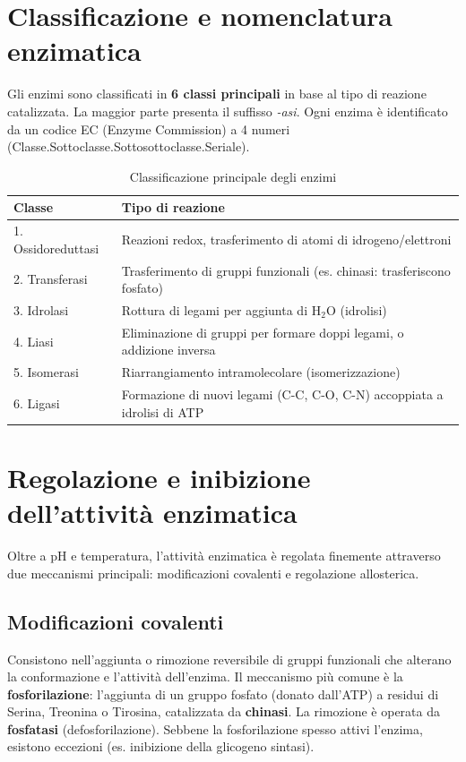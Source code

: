 \documentclass[12pt,a4paper]{report}
\begin{document}
\section{Classificazione e nomenclatura enzimatica}
Gli enzimi sono classificati in \textbf{6 classi principali} in base al tipo di reazione catalizzata. La maggior parte presenta il suffisso \textit{-asi}. Ogni enzima è identificato da un codice EC (Enzyme Commission) a 4 numeri (Classe.Sottoclasse.Sottosottoclasse.Seriale).
\begin{table}[htbp]
\centering
\caption{Classificazione principale degli enzimi}
\label{tab:enzimi-classi}
\renewcommand{\arraystretch}{1.2}
\begin{tabular}{@{} p{} p{} @{}}
\toprule
\textbf{Classe} & \textbf{Tipo di reazione} \\
\midrule
1. Ossidoreduttasi & Reazioni redox, trasferimento di atomi di idrogeno/elettroni \\
2. Transferasi & Trasferimento di gruppi funzionali (es. chinasi: trasferiscono fosfato) \\
3. Idrolasi & Rottura di legami per aggiunta di \(\mathrm{H_2O}\) (idrolisi) \\
4. Liasi & Eliminazione di gruppi per formare doppi legami, o addizione inversa \\
5. Isomerasi & Riarrangiamento intramolecolare (isomerizzazione) \\
6. Ligasi & Formazione di nuovi legami (C-C, C-O, C-N) accoppiata a idrolisi di ATP \\
\bottomrule
\end{tabular}
\end{table}

\section{Regolazione e inibizione dell'attività enzimatica}
Oltre a pH e temperatura, l'attività enzimatica è regolata finemente attraverso due meccanismi principali: modificazioni covalenti e regolazione allosterica.
\subsection{Modificazioni covalenti}
Consistono nell'aggiunta o rimozione reversibile di gruppi funzionali che alterano la conformazione e l'attività dell'enzima. Il meccanismo più comune è la \textbf{fosforilazione}: l'aggiunta di un gruppo fosfato (donato dall'ATP) a residui di Serina, Treonina o Tirosina, catalizzata da \textbf{chinasi}. La rimozione è operata da \textbf{fosfatasi} (defosforilazione). Sebbene la fosforilazione spesso attivi l'enzima, esistono eccezioni (es. inibizione della glicogeno sintasi).
\end{document}
